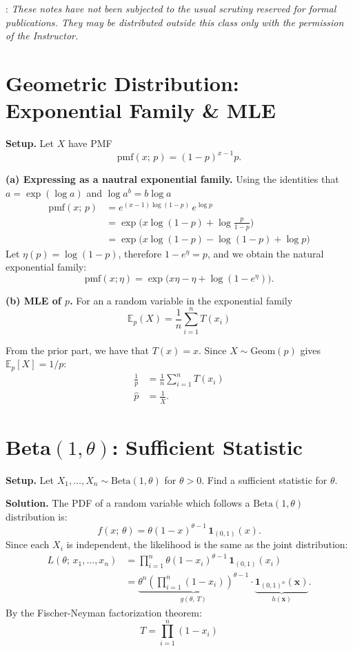 \documentclass{article}
\theoremstyle{plain}
\theoremstyle{definition}
\newcommand{\bbE}{\mathbb{E}}
\begin{document}

: {\it These notes have not been subjected to
  the usual scrutiny reserved for formal publications.  They may be
  distributed outside this class only with the permission of the
Instructor.}

\section{Geometric Distribution: Exponential Family \& MLE}

\noindent\textbf{Setup.} Let $X$ have PMF
\[
  \mathrm{pmf}(x;\,p) = (1-p)^{x-1}p.
\]

\medskip
\noindent\textbf{(a) Expressing as a nautral exponential family.}
Using the identities that $a = \exp(\log a)$ and $\log a^b = b\log a$
\begin{align*}
  \mathrm{pmf}(x;\,p)
  &= e^{(x-1)\log(1-p)}\,e^{\log p}\\
  &= \exp\!\bigl(x\log(1-p)+\log\tfrac{p}{1-p}\bigr) \\
  &= \exp\!\bigl(x\log(1-p)-\log(1-p) + \log p \bigr)
\end{align*}
Let $\eta(p)=\log(1-p)$, therefore $1 - e^\eta = p$, and we obtain the
natural exponential family:
\[
  \mathrm{pmf}(x; \eta) = \exp\!\bigl(x\eta - \eta + \log(1-e^{\eta})\bigr).
\]

\medskip
\noindent\textbf{(b) MLE of $p$.}
For an a random variable in the exponential family
$$\bbE_p(X)=\frac{1}{n}\sum_{i=1}^{n}T(x_i)$$

From the prior part, we have that $T(x) = x$. Since
$X\sim\mathrm{Geom}(p)$ gives $\bbE_p[X]=1/p$:
\begin{align*}
  \frac{1}{p} &= \frac{1}{n}\sum_{i=1}^{n}T(x_i)\\
  \hat{p} &= \frac{1}{\bar{X}}.
\end{align*}

\section{Beta$(1,\theta)$: Sufficient Statistic}

\noindent\textbf{Setup.} Let
$X_1,\ldots,X_n\sim\mathrm{Beta}(1,\theta)$ for $\theta>0$.
Find a sufficient statistic for $\theta$.

\medskip
\noindent\textbf{Solution.}
The PDF of a random variable which follows a
$\mathrm{Beta}(1,\theta)$ distribution is:
\[
  f(x;\,\theta) = \theta(1-x)^{\theta-1}\,\mathbf{1}_{(0,1)}(x).
\]
Since each $X_i$ is independent, the likelihood is the same as the
joint distribution:
\begin{align*}
  L(\theta;\,x_1,\ldots,x_n)
  &= \prod_{i=1}^{n}\theta(1-x_i)^{\theta-1}\,\mathbf{1}_{(0,1)}(x_i)\\
  &=
  \underbrace{\theta^{n}\!\left(\prod_{i=1}^{n}(1-x_i)\right)^{\!\theta-1}}_{g(\theta,\,T)}
  \cdot\underbrace{\mathbf{1}_{(0,1)^n}(\mathbf{x})}_{h(\mathbf{x})}.
\end{align*}
By the Fischer-Neyman factorization theorem:
$$T=\prod_{i=1}^{n}(1-x_i)$$
\end{document}

